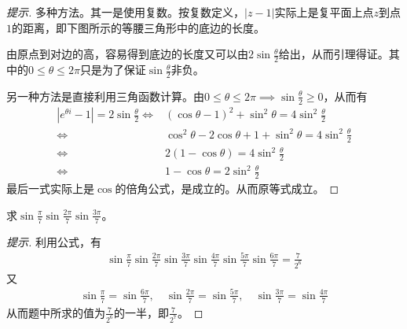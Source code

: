   \begin{proof}[提示]
   多种方法。其一是使用复数。按复数定义，$\left| z - 1\right|$实际上是复平面上点$z$到点$1$的距离，即下图所示的等腰三角形中的底边的长度。
   \begin{center}
   \end{center}
   由原点到对边的高，容易得到底边的长度又可以由$2\sin\frac{\theta}{2}$给出，从而引理得证。其中的$0\le\theta\le2\pi$只是为了保证$\sin\frac\theta2$非负。

   另一种方法是直接利用三角函数计算。由$0\le\theta\le2\pi\implies \sin\frac\theta2\ge0$，从而有
   \begin{align*}
     \left| e^{\theta i} - 1 \right| = 2\sin\frac\theta2 \iff{} & (\cos\theta - 1)^2 + \sin^2\theta = 4\sin^2\frac\theta 2\\
     \iff{} & \cos^2\theta - 2\cos\theta + 1 + \sin^2\theta = 4\sin^2\frac\theta2\\
     \iff{} & 2(1-\cos\theta)=4\sin^2\frac\theta2\\
     \iff{} & 1-\cos\theta = 2\sin^2\frac\theta2                                                                  
   \end{align*}
   最后一式实际上是$\cos$的倍角公式，是成立的。从而原等式成立。
 \end{proof}

 \begin{example}
   求$\sin\frac\pi7 \sin\frac{2\pi}7 \sin\frac{3\pi}7$。
 \end{example}
 \begin{proof}[提示]
   利用公式，有
   \begin{align*}
     \sin\frac\pi7 \sin\frac{2\pi}7 \sin\frac{3\pi}7 \sin\frac{4\pi}7 \sin\frac{5\pi}7 \sin\frac{6\pi}7 =\frac{7}{2^6}
   \end{align*}
   又
   \begin{align*}
     \sin\frac\pi7 = \sin\frac{6\pi}7,\quad
     \sin\frac{2\pi}7 = \sin\frac{5\pi}7,\quad
     \sin\frac{3\pi}7 = \sin\frac{4\pi}7
   \end{align*}
   从而题中所求的值为$\frac{7}{2^6}$的一半，即$\frac{7}{2^7}$。
 \end{proof}